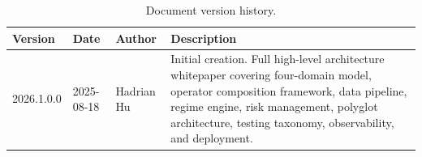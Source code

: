 \documentclass[12pt,openany]{book}
\numberwithin{equation}{chapter}
\theoremstyle{plain}
\theoremstyle{definition}
\theoremstyle{remark}
\begin{document}
\begin{table}[H]
\centering
\caption{Document version history.}
\label{tab:changelog}
\small
\begin{tabularx}{\textwidth}{p{2.8cm} p{2.8cm} p{2.8cm} p{6.0cm}}
\toprule
\textbf{Version} & \textbf{Date} & \textbf{Author} & \textbf{Description} \\
\midrule
2026.1.0.0 & 2025-08-18 & Hadrian Hu &
    Initial creation. Full high-level architecture whitepaper covering
    four-domain model, operator composition framework, data pipeline,
    regime engine, risk management, polyglot architecture, testing
    taxonomy, observability, and deployment. \\
\bottomrule
\end{tabularx}
\end{table}
\end{document}
